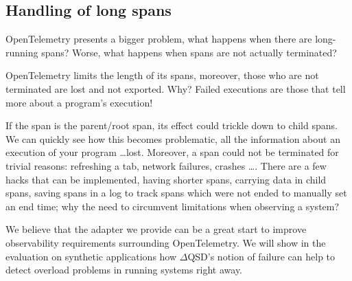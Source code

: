     \subsection{Handling of long spans}
        OpenTelemetry presents a bigger problem, what happens when there are long-running spans? Worse, what happens when spans are not actually terminated?
        
        OpenTelemetry limits the length of its spans, moreover, those who are not terminated are lost and not exported. Why? Failed executions are those that tell more about a program's execution!

        If the span is the parent/root span, its effect could trickle down to child spans. We can quickly see how this becomes problematic, all the information about an execution of your program \dots lost. Moreover, a span could not be terminated for trivial reasons: refreshing a tab, network failures, crashes \dots \cite{otel-l}. There are a few hacks that can be implemented, having shorter spans, carrying data in child spans, saving spans in a log to track spans which were not ended to manually set an end time; why the need to circumvent limitations when observing a system?

     We believe that the adapter we provide can be a great start to improve observability requirements surrounding OpenTelemetry. We will show in the evaluation on synthetic applications how $\Delta$QSD's notion of failure can help to detect overload problems in running systems right away.
